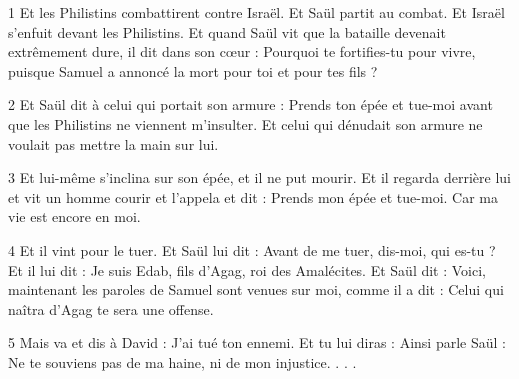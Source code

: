 
\par 1 Et les Philistins combattirent contre Israël. Et Saül partit au combat. Et Israël s'enfuit devant les Philistins. Et quand Saül vit que la bataille devenait extrêmement dure, il dit dans son cœur : Pourquoi te fortifies-tu pour vivre, puisque Samuel a annoncé la mort pour toi et pour tes fils ?

\par 2 Et Saül dit à celui qui portait son armure : Prends ton épée et tue-moi avant que les Philistins ne viennent m'insulter. Et celui qui dénudait son armure ne voulait pas mettre la main sur lui.

\par 3 Et lui-même s'inclina sur son épée, et il ne put mourir. Et il regarda derrière lui et vit un homme courir et l'appela et dit : Prends mon épée et tue-moi. Car ma vie est encore en moi.

\par 4 Et il vint pour le tuer. Et Saül lui dit : Avant de me tuer, dis-moi, qui es-tu ? Et il lui dit : Je suis Edab, fils d'Agag, roi des Amalécites. Et Saül dit : Voici, maintenant les paroles de Samuel sont venues sur moi, comme il a dit : Celui qui naîtra d'Agag te sera une offense.

\par 5 Mais va et dis à David : J'ai tué ton ennemi. Et tu lui diras : Ainsi parle Saül : Ne te souviens pas de ma haine, ni de mon injustice. . . .



